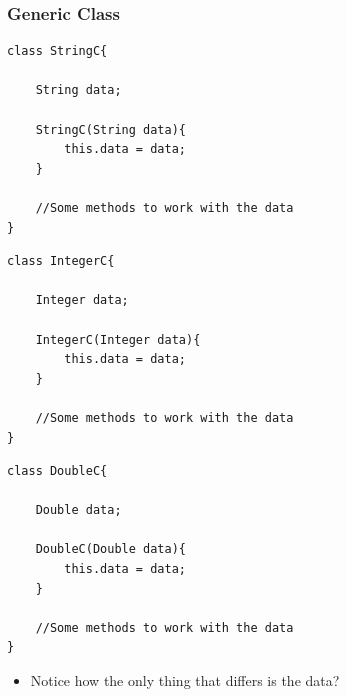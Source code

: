 \documentclass{beamer}
\begin{document}
\begin{frame}[fragile]
    \frametitle{Generic Class}
    \begin{minipage}{0.32\textwidth}
        \begin{lstlisting}[basicstyle=\tiny]
class StringC{

    String data; 
    
    StringC(String data){
        this.data = data;
    }

    //Some methods to work with the data
}
        \end{lstlisting}
    \end{minipage}
    \begin{minipage}{0.32\textwidth}
        \begin{lstlisting}[basicstyle=\tiny]
class IntegerC{

    Integer data; 
    
    IntegerC(Integer data){
        this.data = data;
    }

    //Some methods to work with the data
}
        \end{lstlisting}
    \end{minipage}
    \begin{minipage}{0.32\textwidth}
        \begin{lstlisting}[basicstyle=\tiny]
class DoubleC{

    Double data; 
    
    DoubleC(Double data){
        this.data = data;
    }

    //Some methods to work with the data
}
        \end{lstlisting}
    \end{minipage}
    \begin{itemize}
        \item Notice how the only thing that differs is the data?
    \end{itemize}
\end{frame}
\end{document}
